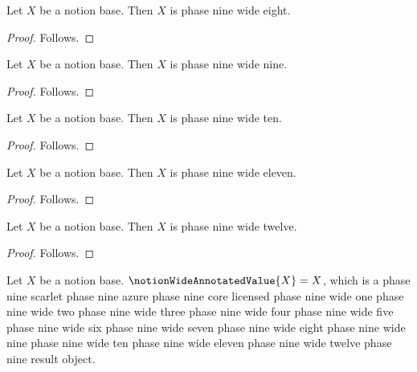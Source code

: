 \begin{classification}\label{notion_base_is_wide_eight}
    Let $X$ be a notion base.
    Then $X$ is phase nine wide eight.
\end{classification}
\begin{proof}
    Follows.
\end{proof}

\begin{classification}\label{notion_base_is_wide_nine}
    Let $X$ be a notion base.
    Then $X$ is phase nine wide nine.
\end{classification}
\begin{proof}
    Follows.
\end{proof}

\begin{classification}\label{notion_base_is_wide_ten}
    Let $X$ be a notion base.
    Then $X$ is phase nine wide ten.
\end{classification}
\begin{proof}
    Follows.
\end{proof}

\begin{classification}\label{notion_base_is_wide_eleven}
    Let $X$ be a notion base.
    Then $X$ is phase nine wide eleven.
\end{classification}
\begin{proof}
    Follows.
\end{proof}

\begin{classification}\label{notion_base_is_wide_twelve}
    Let $X$ be a notion base.
    Then $X$ is phase nine wide twelve.
\end{classification}
\begin{proof}
    Follows.
\end{proof}

\begin{definition}\label{notion_wide_annotated_value}
    Let $X$ be a notion base.
    $\notionWideAnnotatedValue{X}=X$, which is a
        phase nine scarlet phase nine azure phase nine core licensed
        phase nine wide one phase nine wide two phase nine wide three
        phase nine wide four phase nine wide five phase nine wide six
        phase nine wide seven phase nine wide eight phase nine wide nine
        phase nine wide ten phase nine wide eleven phase nine wide twelve
        phase nine result object.
\end{definition}

